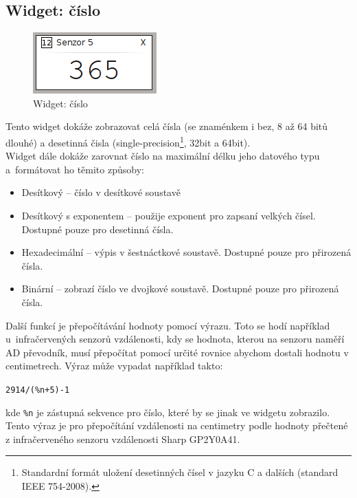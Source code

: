 \documentclass[12pt, a4paper, oneside]{article}
\begin{document}
\subsection{Widget: číslo}
\begin{figure}[h]
\begin{center}
\includegraphics[scale=1]{img/w_num.png}
\caption{Widget: číslo}
\end{center}
\end{figure}
Tento widget dokáže zobrazovat celá čísla (se znaménkem i bez, 8 až 64 bitů dlouhé) a desetinná čisla (single-precision\footnote{Standardní formát uložení desetinných čísel v jazyku C a dalších (standard IEEE 754-2008).}, 32bit a 64bit).\\
Widget dále dokáže zarovnat číslo na maximální délku jeho datového typu\\a~formátovat ho těmito způsoby:
\begin{itemize}
    \item Desítkový -- číslo v desítkové soustavě
    \item Desítkový s exponentem -- použije exponent pro zapsaní velkých čísel. Dostupné pouze pro desetinná čísla.
    \item Hexadecimální -- výpis v šestnáctkové soustavě. Dostupné pouze pro přirozená čísla. 
    \item Binární -- zobrazí číslo ve dvojkové soustavě.  Dostupné pouze pro přirozená čísla.
\end{itemize}

Další funkcí je přepočítávání hodnoty pomocí výrazu. Toto se hodí například u~infračervených senzorů vzdálenosti, kdy se hodnota, kterou na senzoru naměří AD převodník, musí přepočítat pomocí určité rovnice abychom dostali hodnotu v centimetrech. Výraz může vypadat například takto:
\begin{center}
\verb|2914/(%n+5)-1|
\end{center}
kde \verb|%n| je zástupná sekvence pro číslo, které by se jinak ve widgetu zobrazilo. Tento výraz je pro přepočítání vzdálenosti na centimetry podle hodnoty přečtené z infračerveného senzoru vzdálenosti Sharp GP2Y0A41.
\end{document}
